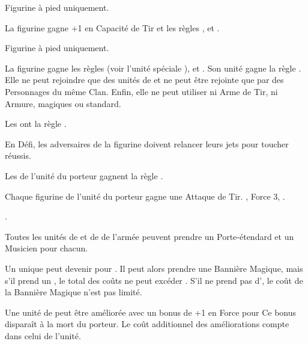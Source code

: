 \begin{multicols}{2}
Figurine à pied uniquement.

La figurine gagne +1 en Capacité de Tir et les règles \scout{}, \masterarcher{} et .

Figurine à pied uniquement.

La figurine gagne les règles \dancesofcenyrn{} (voir l'unité spéciale \bladedancers{}), \immunetopsychology{} et . Son unité gagne la règle \swiftstride{}. Elle ne peut rejoindre que des unités de \bladedancers{} et ne peut être rejointe que par des Personnages du même Clan. Enfin, elle ne peut utiliser ni Arme de Tir, ni Armure, magiques ou standard.

\endpricelistNSP
\closearmynewsection

\vspace*{\fill}
\columnbreak

\toctarget{aspectsofnaturetitle}{%
\vspace*{-1.5cm}\section*{}\noindent\begin{center}\hugefontsize\textbf{\antiquefont\expandafter\uppercase\expandafter{\aspectsofnature}}\end{center}
\largefontsize
}

\spaceaftersection{}

Les \aspectsofnature{} ont la règle \oneperarmy{}.

\startpricelistNSP

 En Défi, les adversaires de la figurine doivent relancer leurs jets pour toucher réussis.

 Les \dryads{} de l'unité du porteur gagnent la règle \hatred{}.

 Chaque figurine de l'unité du porteur gagne une Attaque de Tir. , Force 3, .

 .

Toutes les unités de \dryads{} et de \thicketbeasts{} de l'armée peuvent prendre un Porte-étendard et un Musicien pour  chacun.

Un unique \thicketshepherd{} peut devenir \bsb{} pour . Il peut alors prendre une Bannière Magique, mais s'il prend un \aspectofnature{}, le total des coûts ne peut excéder . S'il ne prend pas d'\aspectofnature{}, le coût de la Bannière Magique n'est pas limité.

 Une unité de \thicketbeasts{} peut être améliorée avec un bonus de +1 en Force pour \permodel{} Ce bonus disparaît à la mort du porteur. Le coût additionnel des améliorations compte dans celui de l'unité.

\endpricelistNSP
\closearmynewsection

\vspace*{\fill}
\end{multicols}
